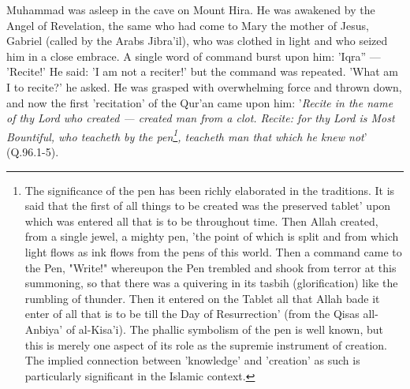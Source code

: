 \documentclass[11pt, b5paper, twoside]{book}
\begin{document}
Muhammad was asleep in the cave on Mount Hira. He was awakened by the Angel of Revelation, the same who had come to Mary the mother of Jesus, Gabriel (called by the Arabs Jibra'il), who was clothed in light and who seized him in a close embrace. A single word of command burst upon him: 'Iqra'' --- 
'Recite!' He said: 'I am not a reciter!' but the command was repeated. 'What am I to recite?' he 
asked. He was grasped with overwhelming force and thrown down, and now the first 'recitation' of the 
Qur'an came upon him: '\emph{Recite in the name of thy Lord who created --- created man from a clot. Recite: for thy Lord is Most Bountiful, who teacheth by the pen\footnote{The significance of the pen has been richly elaborated in the traditions. It is said that the first of all things to be created was the preserved tablet' upon which was entered all that is to be throughout time. Then Allah created, from a single jewel, a mighty pen, 'the point of which is split and from which light flows as ink flows from the pens of this world. Then a command came to the Pen, "Write!" whereupon the Pen trembled and shook from terror at this summoning, so that there was a quivering in its tasbih (glorification) like the rumbling of thunder. Then it entered on the Tablet all that Allah bade it enter of all that is to be till the Day of Resurrection' (from the Qisas all-Anbiya' of al-Kisa'i). The phallic symbolism of the pen is well known, but this is merely one aspect of its role as the supremie instrument of creation. The implied connection between 'knowledge' and 'creation' as such is particularly significant in the Islamic context.}, teacheth man that which he knew 
not}' (Q.96.1-5). \\
\end{document}
